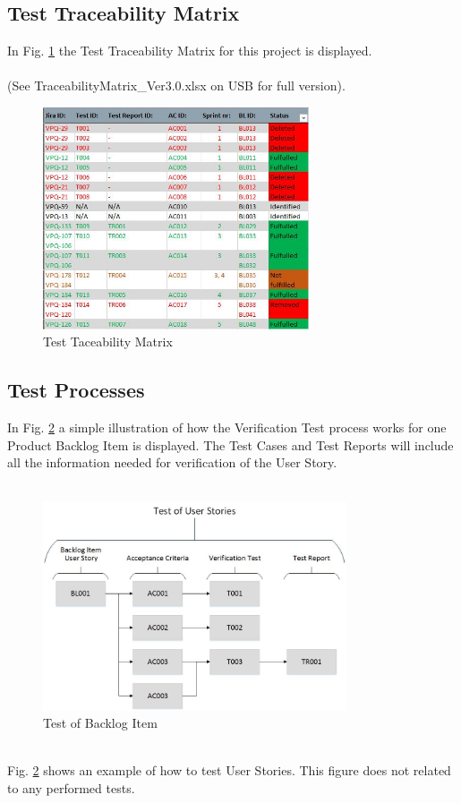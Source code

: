 \newpage

\subsection*{Test Traceability Matrix}
In Fig. \ref{fig:Tmatrix} the Test Traceability Matrix for this project is displayed.\\\\ (See TraceabilityMatrix\_Ver3.0.xlsx on USB for full version).

\begin{figure}[h]
    \centering
        \includegraphics[width=0.7\textwidth]{VAPIQ-PICTURES/Tmatrix}
        \caption{Test Taceability Matrix}
        \label{fig:Tmatrix}
\end{figure}

\newpage

\subsection*{Test Processes}
In Fig. \ref{fig:testsetup} a simple illustration of how the Verification Test process works for one Product Backlog Item is displayed. The Test Cases and Test Reports will include all the information needed for verification of the User Story.\\
\\
\begin{figure}[h]
    \centering
        \includegraphics[width=0.8\textwidth]{VAPIQ-PICTURES/testdocbild}
        \caption{Test of Backlog Item}
        \label{fig:testsetup}
\end{figure}
\\
Fig. \ref{fig:testsetup} shows an example of how to test User Stories. This figure does not related to any performed tests.\\

